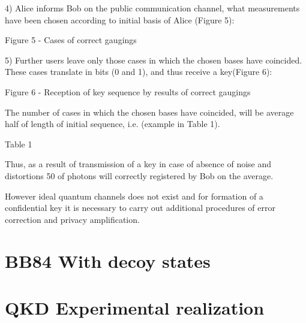 4) Alice informs Bob on the public communication channel, what
measurements have been chosen according to initial basis of Alice
(Figure 5):


Figure 5 - Cases of correct gaugings

5) Further users leave only those cases in which the chosen bases have
coincided. These cases translate in bits (0 and 1), and thus receive a
key(Figure 6):


Figure 6 - Reception of key sequence by results of correct gaugings

The number of cases in which the chosen bases have coincided, will be
average half of length of initial sequence, i.e.  (example in Table
1).



Table 1



Thus, as a result of transmission of a key in case of absence of noise
and distortions
50 of photons will correctly registered by Bob on the average.

However ideal quantum channels does not exist and for formation of a
confidential key it is necessary to carry out additional procedures of
error correction and privacy amplification.


\section{BB84 With decoy states}


\section{QKD Experimental realization}

